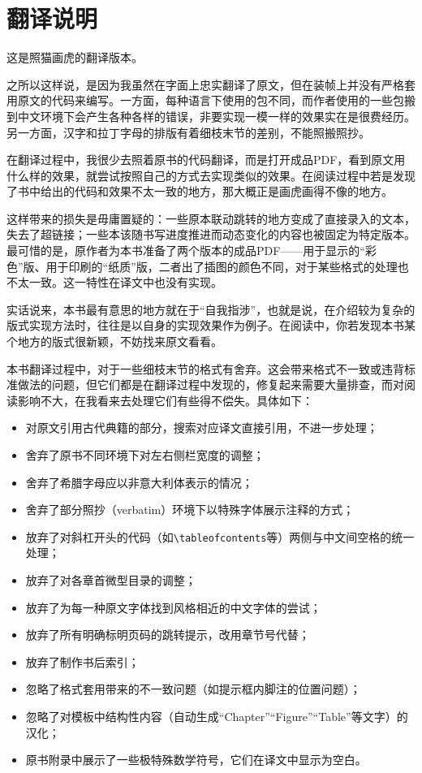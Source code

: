 \chapter*{翻译说明}

这是照猫画虎的翻译版本。

之所以这样说，是因为我虽然在字面上忠实翻译了原文，但在装帧上并没有严格套用原文的代码来编写。一方面，每种语言下使用的包不同，而作者使用的一些包搬到中文环境下会产生各种各样的错误，非要实现一模一样的效果实在是很费经历。另一方面，汉字和拉丁字母的排版有着细枝末节的差别，不能照搬照抄。

在翻译过程中，我很少去照着原书的代码翻译，而是打开成品PDF，看到原文用什么样的效果，就尝试按照自己的方式去实现类似的效果。在阅读过程中若是发现了书中给出的代码和效果不太一致的地方，那大概正是画虎画得不像的地方。

这样带来的损失是毋庸置疑的：一些原本联动跳转的地方变成了直接录入的文本，失去了超链接；一些本该随书写进度推进而动态变化的内容也被固定为特定版本。最可惜的是，原作者为本书准备了两个版本的成品PDF——用于显示的``彩色''版、用于印刷的``纸质''版，二者出了插图的颜色不同，对于某些格式的处理也不太一致。这一特性在译文中也没有实现。

实话说来，本书最有意思的地方就在于``自我指涉''，也就是说，在介绍较为复杂的版式实现方法时，往往是以自身的实现效果作为例子。在阅读中，你若发现本书某个地方的版式很新颖，不妨找来原文看看。

本书翻译过程中，对于一些细枝末节的格式有舍弃。这会带来格式不一致或违背标准做法的问题，但它们都是在翻译过程中发现的，修复起来需要大量排查，而对阅读影响不大，在我看来去处理它们有些得不偿失。具体如下：
\begin{itemize}
    \item 对原文引用古代典籍的部分，搜索对应译文直接引用，不进一步处理；
    \item 舍弃了原书不同环境下对左右侧栏宽度的调整；
    \item 舍弃了希腊字母应以非意大利体表示的情况；
    \item 舍弃了部分照抄（verbatim）环境下以特殊字体展示注释的方式；
    \item 放弃了对斜杠开头的代码（如\verb+\tableofcontents+等）两侧与中文间空格的统一处理；
    \item 放弃了对各章首微型目录的调整；
    \item 放弃了为每一种原文字体找到风格相近的中文字体的尝试；
    \item 放弃了所有明确标明页码的跳转提示，改用章节号代替；
    \item 放弃了制作书后索引；
    \item 忽略了格式套用带来的不一致问题（如提示框内脚注的位置问题）；
    \item 忽略了对模板中结构性内容（自动生成``Chapter''``Figure''``Table''等文字）的汉化；
    \item 原书附录中展示了一些极特殊数学符号，它们在译文中显示为空白。
\end{itemize}

